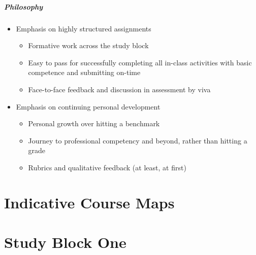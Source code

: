 \begin{frame}
	\frametitle{Philosophy}
	
	\begin{itemize}
		\item Emphasis on highly structured assignments 
		\begin{itemize}
			\item Formative work across the study block
			\item Easy to pass for successfully completing all in-class activities with basic competence and submitting on-time
			\item Face-to-face feedback and discussion in assessment by viva			
		\end{itemize}
		\pause\item Emphasis on continuing personal development
		\begin{itemize}
			\item Personal growth over hitting a benchmark
			\item Journey to professional competency and beyond, rather than hitting a grade
			\item Rubrics and qualitative feedback (at least, at first)			
		\end{itemize}
	\end{itemize}
\end{frame}

\part{Indicative Course Maps}
\frame{\partpage}






\part{Study Block One}
\frame{\partpage}

